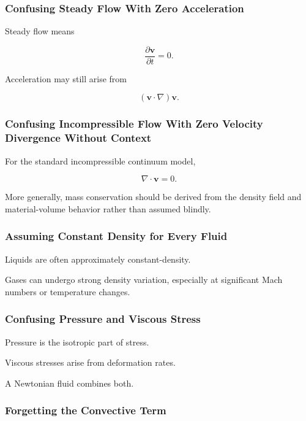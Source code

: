 \subsubsection{Confusing Steady Flow With Zero Acceleration}

Steady flow means

\[
\frac{\partial\mathbf{v}}{\partial t}=0.
\]

Acceleration may still arise from

\[
(\mathbf{v}\cdot\nabla)\mathbf{v}.
\]

\subsubsection{Confusing Incompressible Flow With Zero Velocity Divergence Without Context}

For the standard incompressible continuum model,

\[
\nabla\cdot\mathbf{v}=0.
\]

More generally, mass conservation should be derived from the density field and
material-volume behavior rather than assumed blindly.

\subsubsection{Assuming Constant Density for Every Fluid}

Liquids are often approximately constant-density.

Gases can undergo strong density variation, especially at significant Mach
numbers or temperature changes.

\subsubsection{Confusing Pressure and Viscous Stress}

Pressure is the isotropic part of stress.

Viscous stresses arise from deformation rates.

A Newtonian fluid combines both.

\subsubsection{Forgetting the Convective Term}

